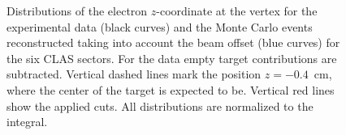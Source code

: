 \begin{figure}[!ht]
\begin{center}
\end{center}
\caption{\small Distributions of the electron $z$-coordinate at the vertex for the experimental data (black curves) and the Monte Carlo events reconstructed taking into account the beam offset (blue curves) for the six CLAS sectors. For the data empty target contributions are subtracted. Vertical dashed lines mark the position $z = -0.4$~cm, where the center of the target is expected to be. Vertical red lines show the applied cuts. All distributions are normalized to the integral. }
\label{fig:z_el_data_sim}
\end{figure}

